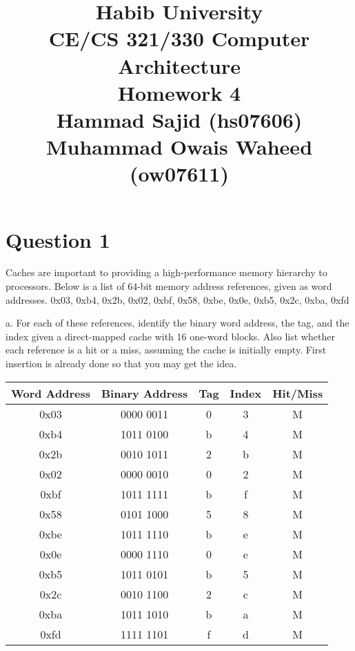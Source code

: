 \documentclass{article}
\title{\textbf{\huge Habib University}\\[0.5cm]
\Large CE/CS 321/330 Computer Architecture\\[0.5cm]
\large Homework 4\\[0.5cm]
\large Hammad Sajid (hs07606)
\\ \large Muhammad Owais Waheed (ow07611)}
\author{}
\date{}
\begin{document}
\maketitle

\section*{Question 1}
Caches are important to providing a high-performance memory hierarchy to processors. Below is
a list of 64-bit memory address references, given as word addresses.
0x03, 0xb4, 0x2b, 0x02, 0xbf, 0x58, 0xbe, 0x0e, 0xb5, 0x2c, 0xba, 0xfd

\vspace*{0.5 cm}
a. For each of these references, identify the binary word address, the tag, and the
index given a direct-mapped cache with 16 one-word blocks. Also list whether each
reference is a hit or a miss, assuming the cache is initially empty. First insertion is already
done so that you may get the idea.

\begin{table}[h]
    \centering
    \begin{tabular}{|c|c|c|c|c|}
        \hline
        \rowcolor[gray]{0.8}
        Word Address & Binary Address  & Tag  & Index & Hit/Miss\\
        \hline
        0x03 & 0000 0011 & 0 & 3 & M\\
        \hline
        0xb4 & 1011 0100 & b & 4 & M\\
        \hline
        0x2b & 0010 1011 & 2 & b & M\\
        \hline
        0x02 & 0000 0010 & 0 & 2 & M\\
        \hline
        0xbf & 1011 1111 & b & f & M\\
        \hline
        0x58 & 0101 1000 & 5 & 8 & M\\
        \hline
        0xbe & 1011 1110 & b & e & M\\
        \hline
        0x0e & 0000 1110 & 0 & e & M\\
        \hline
        0xb5 & 1011 0101 & b & 5 & M\\
        \hline
        0x2c & 0010 1100 & 2 & c & M\\
        \hline
        0xba & 1011 1010 & b & a & M\\
        \hline
        0xfd & 1111 1101 & f & d & M\\
        \hline
    \end{tabular}
    \label{tab:mytable}
\end{table}
\end{document}
